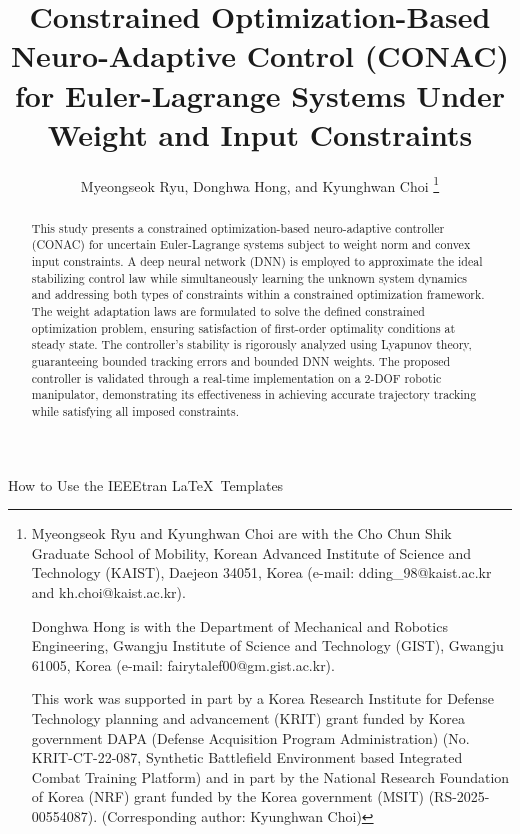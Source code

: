 \documentclass[lettersize,journal]{IEEEtran}
\begin{document}
\title{
    Constrained Optimization-Based Neuro-Adaptive Control (CONAC) for Euler-Lagrange Systems Under Weight and Input Constraints
} %

\author{
  Myeongseok Ryu, Donghwa Hong, and Kyunghwan Choi
\thanks{
    Myeongseok Ryu and Kyunghwan Choi are with the Cho Chun Shik Graduate School of Mobility, Korean Advanced Institute of Science and Technology (KAIST), Daejeon 34051, Korea (e-mail: dding\_98@kaist.ac.kr and kh.choi@kaist.ac.kr).

    Donghwa Hong is with the Department of Mechanical and Robotics Engineering, Gwangju Institute of Science and Technology (GIST), Gwangju 61005, Korea (e-mail: fairytalef00@gm.gist.ac.kr).

    This work was supported in part by a Korea Research Institute for Defense Technology planning and advancement (KRIT) grant funded by Korea government DAPA (Defense Acquisition Program Administration) (No. KRIT-CT-22-087, Synthetic Battlefield Environment based Integrated Combat Training Platform) and in part by the National Research Foundation of Korea (NRF) grant funded by the Korea government (MSIT) (RS-2025- 00554087). (Corresponding author: Kyunghwan Choi)
    }}

%
{How to Use the IEEEtran \LaTeX \ Templates}

\maketitle

\begin{abstract}
  This study presents a constrained optimization-based neuro-adaptive controller (CONAC) for uncertain Euler-Lagrange systems subject to weight norm and convex input constraints. 
  A deep neural network (DNN) is employed to approximate the ideal stabilizing control law while simultaneously learning the unknown system dynamics and addressing both types of constraints within a constrained optimization framework.
  The weight adaptation laws are formulated to solve the defined constrained optimization problem, ensuring satisfaction of first-order optimality conditions at steady state.
  The controller's stability is rigorously analyzed using Lyapunov theory, guaranteeing bounded tracking errors and bounded DNN weights. 
  The proposed controller is validated through a real-time implementation on a 2-DOF robotic manipulator, demonstrating its effectiveness in achieving accurate trajectory tracking while satisfying all imposed constraints.
\end{abstract}
\end{document}
